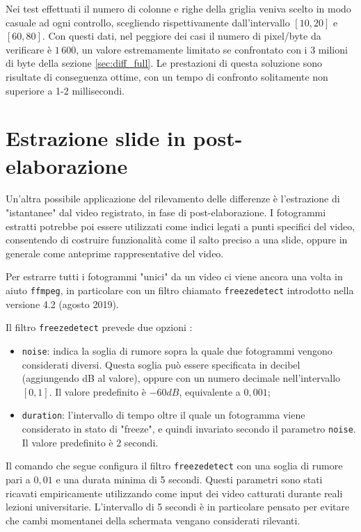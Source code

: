 Nei test effettuati il numero di colonne e righe della griglia veniva scelto in modo casuale ad ogni controllo, scegliendo rispettivamente dall'intervallo $[10, 20]$ e $[60, 80]$. Con questi dati, nel peggiore dei casi il numero di pixel/byte da verificare è $1\,600$, un valore estremamente limitato se confrontato con i 3 milioni di byte della sezione \ref{sec:diff_full}. Le prestazioni di questa soluzione sono risultate di conseguenza ottime, con un tempo di confronto solitamente non superiore a 1-2 millisecondi.

\section{Estrazione slide in post-elaborazione}
\label{sec:diff_postprod}

Un'altra possibile applicazione del rilevamento delle differenze è l'estrazione di "istantanee" dal video registrato, in fase di post-elaborazione. I fotogrammi estratti potrebbe poi essere utilizzati come indici legati a punti specifici del video, consentendo di costruire funzionalità come il salto preciso a una slide, oppure in generale come anteprime rappresentative del video.

Per estrarre tutti i fotogrammi "unici" da un video ci viene ancora una volta in aiuto \texttt{ffmpeg}, in particolare con un filtro chiamato \texttt{freezedetect} introdotto nella versione 4.2 (agosto 2019).

Il filtro \texttt{freezedetect} prevede due opzioni \cite{ffmpeg}:

\begin{itemize}
	\item \texttt{noise}: indica la soglia di rumore sopra la quale due fotogrammi vengono considerati diversi. Questa soglia può essere specificata in decibel (aggiungendo dB al valore), oppure con un numero decimale nell'intervallo $[0, 1]$. Il valore predefinito è $-60 dB$, equivalente a $0,001$;
	\item \texttt{duration}: l'intervallo di tempo oltre il quale un fotogramma viene considerato in stato di "freeze", e quindi invariato secondo il parametro \texttt{noise}. Il valore predefinito è 2 secondi.
\end{itemize}

Il comando che segue configura il filtro \texttt{freezedetect} con una soglia di rumore pari a $0,01$ e una durata minima di 5 secondi. Questi parametri sono stati ricavati empiricamente utilizzando come input dei video catturati durante reali lezioni universitarie. L'intervallo di 5 secondi è in particolare pensato per evitare che cambi momentanei della schermata vengano considerati rilevanti.

